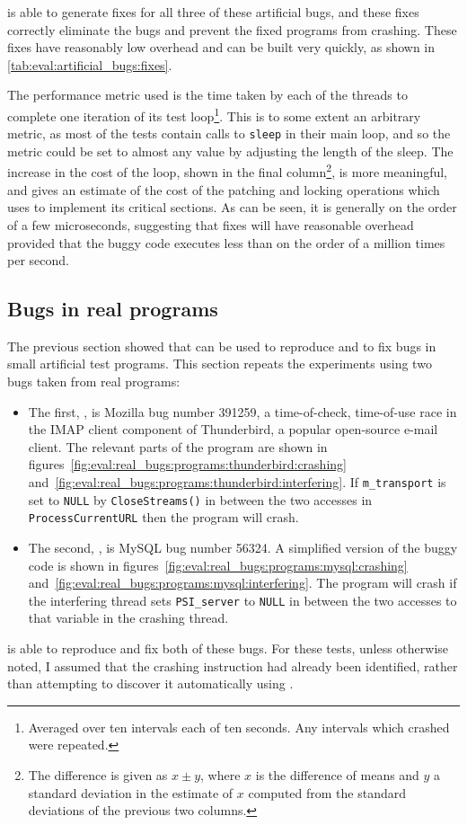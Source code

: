 {\Technique} is able to generate fixes for all three of these
artificial bugs, and these fixes correctly eliminate the bugs and
prevent the fixed programs from crashing.  These fixes have reasonably
low overhead and can be built very quickly, as shown in
\autoref{tab:eval:artificial_bugs:fixes}.

The performance metric used is the time taken by each of the threads
to complete one iteration of its test loop\footnote{Averaged over ten
  intervals each of ten seconds.  Any intervals which crashed were
  repeated.}.  This is to some extent an arbitrary metric, as most of
the tests contain calls to \texttt{sleep} in their main loop, and so
the metric could be set to almost any value by adjusting the length of
the sleep.  The increase in the cost of the loop, shown in the final
column\footnote{The difference is given as $x \pm y$, where $x$ is the
  difference of means and $y$ a standard deviation in the estimate of
  $x$ computed from the standard deviations of the previous two
  columns.}, is more meaningful, and gives an estimate of the cost of
the patching and locking operations which {\implementation} uses to
implement its critical sections.  As can be seen, it is generally on
the order of a few microseconds, suggesting that {\technique} fixes
will have reasonable overhead provided that the buggy code executes
less than on the order of a million times per second.

\subsection{Bugs in real programs}

The previous section showed that {\technique} can be used to reproduce
and to fix bugs in small artificial test programs.  This section
repeats the experiments using two bugs taken from real programs:
\begin{itemize}
\item The first, , is Mozilla bug number
  391259\cite{Mery2007}, a time-of-check, time-of-use race in the IMAP
  client component of Thunderbird, a popular open-source e-mail
  client.  The relevant parts of the program are shown in
  figures~\ref{fig:eval:real_bugs:programs:thunderbird:crashing}
  and~\ref{fig:eval:real_bugs:programs:thunderbird:interfering}.  If
  \verb|m_transport| is set to \verb|NULL| by \verb|CloseStreams()| in
  between the two accesses in \verb|ProcessCurrentURL| then the
  program will crash.
\item The second, , is MySQL bug number
  56324\needCite{}.  A simplified version of the buggy code is shown
  in figures~\ref{fig:eval:real_bugs:programs:mysql:crashing}
  and~\ref{fig:eval:real_bugs:programs:mysql:interfering}.  The
  program will crash if the interfering thread sets
  \texttt{PSI\_server} to \texttt{NULL} in between the two accesses to
  that variable in the crashing thread.
\end{itemize}
{\Technique} is able to reproduce and fix both of these bugs.  For
these tests, unless otherwise noted, I assumed that the crashing
instruction had already been identified, rather than attempting to
discover it automatically using {\technique}.

